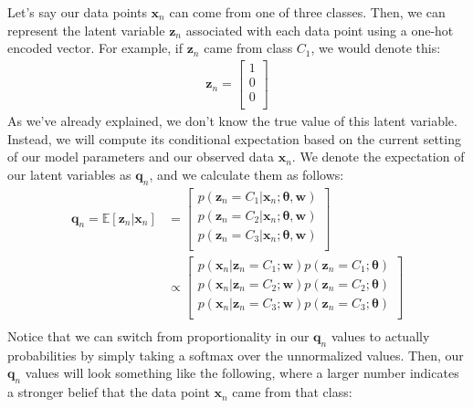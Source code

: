 Let's say our data points $\textbf{x}_n$ can come from one of three classes. Then, we can represent the latent variable $\textbf{z}_n$ associated with each data point using a one-hot encoded vector. For example, if $\textbf{z}_n$ came from class $C_1$, we would denote this:
\begin{align*}
    \textbf{z}_n = 
        \begin{bmatrix}
            1 \\
            0 \\
            0 \\
        \end{bmatrix}
\end{align*}
As we've already explained, we don't know the true value of this latent variable. Instead, we will compute its conditional expectation based on the current setting of our model parameters and our observed data $\textbf{x}_n$. We denote the expectation of our latent variables as $\textbf{q}_n$, and we calculate them as follows:
\begin{align*}
    \textbf{q}_n = \mathbb{E}[\textbf{z}_n | \textbf{x}_n] &= \begin{bmatrix}
            p(\textbf{z}_n = C_1 | \textbf{x}_n; \boldsymbol{\theta}, \textbf{w}) \\
            p(\textbf{z}_n = C_2 | \textbf{x}_n; \boldsymbol{\theta}, \textbf{w}) \\
            p(\textbf{z}_n = C_3 | \textbf{x}_n; \boldsymbol{\theta}, \textbf{w}) \\
        \end{bmatrix} \\
        &\propto \begin{bmatrix}
            p(\textbf{x}_n | \textbf{z}_n = C_1; \textbf{w})p(\textbf{z}_n = C_1; \boldsymbol{\theta}) \\
            p(\textbf{x}_n | \textbf{z}_n = C_2; \textbf{w})p(\textbf{z}_n = C_2; \boldsymbol{\theta}) \\
            p(\textbf{x}_n | \textbf{z}_n = C_3; \textbf{w})p(\textbf{z}_n = C_3; \boldsymbol{\theta}) \\
        \end{bmatrix} \\
\end{align*}
Notice that we can switch from proportionality in our $\textbf{q}_n$ values to actually probabilities by simply taking a softmax over the unnormalized values. Then, our $\textbf{q}_n$ values will look something like the following, where a larger number indicates a stronger belief that the data point $\textbf{x}_n$ came from that class:
